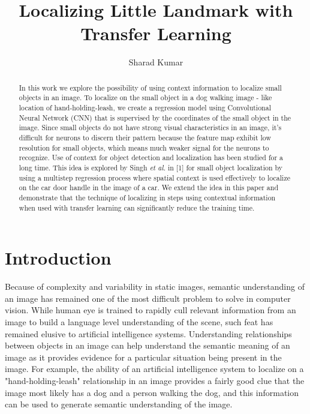 \documentclass [11pt,letterpaper ,twoside ,openany ]{report}
\title{Localizing Little Landmark with Transfer Learning}
\author{Sharad Kumar}
\begin{document}
  \maketitle
  \tableofcontents
  


    \begin{abstract}
    In this work we explore the possibility of using context information to localize small objects in an image. To localize on the small object in a dog walking image - like location of hand-holding-leash, we create a regression model using Convolutional Neural Network (CNN) that is supervised by the coordinates of the small object in the image. Since small objects do not have strong visual characteristics in an image, it's difficult for neurons to discern their pattern because the feature map exhibit low resolution for small objects, which means much weaker signal for the neurons to recognize. Use of context for object detection and localization has been studied for a long time. This idea is explored by Singh \textit{et al.} in [1] for small object localization by using a multistep regression process where  spatial context is used effectively to localize on the car door handle in the image of a car. We extend the idea in this paper and demonstrate that the technique of localizing in steps using contextual information when used with transfer learning can significantly reduce the training time.
    \end{abstract}    

    \listoffigures

    \chapter{Introduction}
    \doublespacing
    Because of complexity and variability in static images, semantic understanding of an image has remained one of the most difficult problem to solve in computer vision. While human eye is trained to rapidly cull relevant information from an image to build a language level understanding of the scene, such feat has remained elusive to artificial intelligence systems. Understanding relationships between objects in an image can help understand the semantic meaning of an image as it provides evidence for a particular situation being present in the image. For example, the ability of an artificial intelligence system to localize on a "hand-holding-leash" relationship in an image provides a fairly good clue that the image most likely has a dog and a person walking the dog, and this information can be used to generate semantic understanding of the image.
\end{document}
